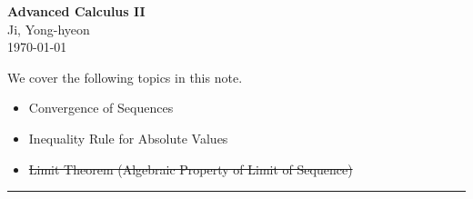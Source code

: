 \documentclass[11pt,openany]{article}
\begin{document}
\begin{center}
	\huge\textbf{Advanced Calculus II}\\
	\vspace{0.5em}
	\large{Ji, Yong-hyeon}\\
	\vspace{0.5em}
	\normalsize{\today}\\
\end{center}

\noindent 
We cover the following topics in this note.
\begin{itemize}
	\item Convergence of Sequences
	\item Inequality Rule for Absolute Values
	\item \st{Limit Theorem (Algebraic Property of Limit of Sequence)}
\end{itemize}
\hrule\vspace{12pt}
\end{document}
